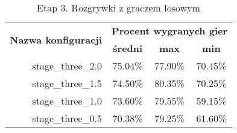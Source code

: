\begin{longtable}[c]{|r|c|c|c|}
\caption{\label{tab:results/stage_three_all_with_random}Etap 3. Rozgrywki z graczem losowym} \\
\hline

\multirow{2}{*}{\textbf{Nazwa konfiguracji}} & \multicolumn{3}{|c|}{\textbf{Procent wygranych gier}} \\
\cline{2-4}
&\textbf{średni} & \textbf{max} & \textbf{min} \\
\hline
stage\_three\_2.0 & 75.04\% & 77.90\% & 70.45\% \\
\hline
stage\_three\_1.5 & 74.50\% & 80.35\% & 70.25\% \\
\hline
stage\_three\_1.0 & 73.60\% & 79.55\% & 59.15\% \\
\hline
stage\_three\_0.5 & 70.38\% & 79.25\% & 61.60\% \\
\hline
\end{longtable}
